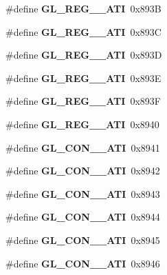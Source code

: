 \begin{DoxyCompactItemize}
\item 
\#define {\bfseries G\+L\+\_\+\+R\+E\+G\+\_\+\_\+\+A\+T\+I}~0x893\+B\label{_s_d_l__opengl_8h_a759fc50e45485d9a429cd78b9d00f6ec}

\item 
\#define {\bfseries G\+L\+\_\+\+R\+E\+G\+\_\+\_\+\+A\+T\+I}~0x893\+C\label{_s_d_l__opengl_8h_a0f69fef5f8fda7c806f9e68c331061e1}

\item 
\#define {\bfseries G\+L\+\_\+\+R\+E\+G\+\_\+\_\+\+A\+T\+I}~0x893\+D\label{_s_d_l__opengl_8h_af1ac47908ee1b0a768fba8846f8ea5e0}

\item 
\#define {\bfseries G\+L\+\_\+\+R\+E\+G\+\_\+\_\+\+A\+T\+I}~0x893\+E\label{_s_d_l__opengl_8h_ab4de460868303a22a3b9e5434f5783f6}

\item 
\#define {\bfseries G\+L\+\_\+\+R\+E\+G\+\_\+\_\+\+A\+T\+I}~0x893\+F\label{_s_d_l__opengl_8h_a2fc698741bc630108429ac4fa4a22f29}

\item 
\#define {\bfseries G\+L\+\_\+\+R\+E\+G\+\_\+\_\+\+A\+T\+I}~0x8940\label{_s_d_l__opengl_8h_ac6a92fe32cc0fe7600649cbd9731e016}

\item 
\#define {\bfseries G\+L\+\_\+\+C\+O\+N\+\_\+\_\+\+A\+T\+I}~0x8941\label{_s_d_l__opengl_8h_aa586154013e00b150a1bb2bb5cfcbe05}

\item 
\#define {\bfseries G\+L\+\_\+\+C\+O\+N\+\_\+\_\+\+A\+T\+I}~0x8942\label{_s_d_l__opengl_8h_a2f12ee6ab907f3155cc4c932ea9d6bfe}

\item 
\#define {\bfseries G\+L\+\_\+\+C\+O\+N\+\_\+\_\+\+A\+T\+I}~0x8943\label{_s_d_l__opengl_8h_a730a7118709f550abceba59113a4c4ae}

\item 
\#define {\bfseries G\+L\+\_\+\+C\+O\+N\+\_\+\_\+\+A\+T\+I}~0x8944\label{_s_d_l__opengl_8h_a9790a78e29fa264bb43d1c76ac3c8451}

\item 
\#define {\bfseries G\+L\+\_\+\+C\+O\+N\+\_\+\_\+\+A\+T\+I}~0x8945\label{_s_d_l__opengl_8h_abbd5a83013f2d13c3f465f308d57f44d}

\item 
\#define {\bfseries G\+L\+\_\+\+C\+O\+N\+\_\+\_\+\+A\+T\+I}~0x8946\label{_s_d_l__opengl_8h_a9587099e426acd5e70ae8062e0f529f3}


\end{DoxyCompactItemize}

